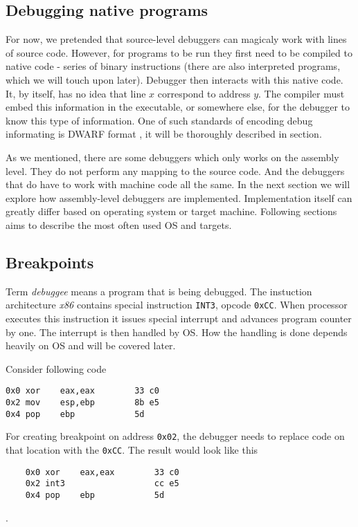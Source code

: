 \begin{itemize}
\section{Debugging native programs}
For now, we pretended that source-level debuggers can magicaly work with lines of source code. However, for programs to be run they first need to be compiled to native code - series of binary instructions (there are also interpreted programs, which we will touch upon later). Debugger then interacts with this native code. It, by itself, has no idea that line $x$ correspond to address $y$. The compiler must embed this information in the executable, or somewhere else, for the debugger to know this type of information. One of such standards of encoding debug informating is DWARF format \cite{dwarf}, it will be thoroughly described in  section.  

As we mentioned, there are some debuggers which only works on the assembly level. They do not perform any mapping to the source code. And the debuggers that do have to work with machine code all the same. In the next section we will explore how assembly-level debuggers are implemented. Implementation itself can greatly differ based on operating system or target machine. Following sections aims to describe the most often used OS and targets.

\subsection{Breakpoints}
Term \textit{debuggee} means a program that is being debugged. The instuction architecture \textit{x86} contains special instruction \lstinline{INT3}, opcode \lstinline{0xCC}. When processor executes this instruction it issues special interrupt and advances program counter by one. The interrupt is then handled by OS. How the handling is done depends heavily on OS and will be covered later. 

Consider following code
\begin{lstlisting}
0x0 xor    eax,eax        33 c0
0x2 mov    esp,ebp        8b e5
0x4 pop    ebp            5d
\end{lstlisting}

For creating breakpoint on address \lstinline{0x02}, the debugger needs to replace code on that location with the \lstinline{0xCC}. The result would look like this 

\begin{lstlisting}
    0x0 xor    eax,eax        33 c0
    0x2 int3                  cc e5
    0x4 pop    ebp            5d
\end{lstlisting}.


\end{itemize}
